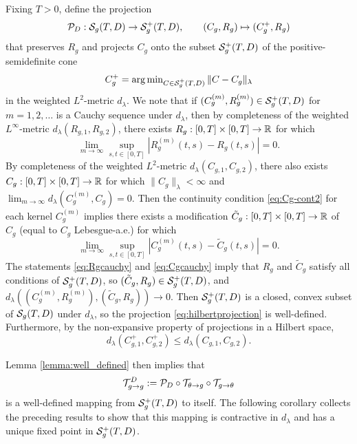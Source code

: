 Fixing $T>0$, define the projection
\[\mathcal{P}_D:\mathcal{S}_g(T,D) \to \mathcal{S}_g^+(T,D),
\qquad (C_g,R_g) \mapsto (C_g^+,R_g)\]
that preserves $R_g$ and projects $C_g$ onto the subset $\mathcal{S}_g^+(T,D)$ of the positive-semidefinite cone
\begin{equation}\label{eq:hilbertprojection}
C_g^+=\operatorname{arg\,min}_{C \in \mathcal{S}_g^+(T,D)} \|C-C_g\|_\lambda
\end{equation}
in the weighted $L^2$-metric $d_\lambda$. We note that if $(C_g^{(m)},R_g^{(m)}) \in \mathcal{S}_g^+(T,D)$
for $m=1,2,\ldots$ is a Cauchy sequence under $d_\lambda$,
then by completeness of the weighted $L^\infty$-metric
$d_\lambda(R_{g,1},R_{g,2})$, there exists $R_g:[0,T] \times [0,T] \to \mathbb{R}$ for
which
\begin{equation}\label{eq:Rgcauchy}
\lim_{m \to \infty} \sup_{s,t \in [0,T]} |R_g^{(m)}(t,s)-R_g(t,s)|=0.
\end{equation}
By completeness of the weighted $L^2$-metric $d_\lambda(C_{g,1},C_{g,2})$,
there also exists $C_g:[0,T] \times [0,T] \to \mathbb{R}$ for which
$\|C_g\|_\lambda<\infty$
and $\lim_{m \to \infty} d_\lambda(C_g^{(m)},C_g)=0$. 
Then the continuity condition \eqref{eq:Cg-cont2} for each kernel $C_g^{(m)}$
implies there exists
a modification $\tilde C_g:[0,T] \times [0,T] \to \mathbb{R}$ of $C_g$ (equal to $C_g$
Lebesgue-a.e.) for which
\begin{equation}\label{eq:Cgcauchy}
\lim_{m \to \infty} \sup_{s,t \in [0,T]} |C_g^{(m)}(t,s)-\tilde C_g(t,s)|=0.
\end{equation}
The statements \eqref{eq:Rgcauchy} and \eqref{eq:Cgcauchy} imply that $R_g$ and $\tilde C_g$ satisfy all conditions of
$\mathcal{S}_g^+(T,D)$, so $(\tilde C_g,R_g) \in \mathcal{S}_g^+(T,D)$,
and $d_\lambda((C_g^{(m)},R_g^{(m)}),(\tilde C_g,R_g)) \to 0$.
Then $\mathcal{S}_g^+(T,D)$ is a
closed, convex subset of $\mathcal{S}_g(T,D)$ under $d_\lambda$, so the
projection \eqref{eq:hilbertprojection} is well-defined. Furthermore, by the
non-expansive property of projections in a Hilbert space,
\begin{equation}\label{eq:projectioncontractive}
d_\lambda(C_{g,1}^+,C_{g,2}^+) \leq d_\lambda(C_{g,1},C_{g,2}).
\end{equation}

Lemma \ref{lemma:well_defined} then implies that
\[\mathcal{T}_{g \to g}^D:=\mathcal{P}_D \circ \mathcal{T}_{\theta \to g} \circ \mathcal{T}_{g \to \theta}\]
is a well-defined mapping from $\mathcal{S}_g^+(T,D)$ to itself. The following corollary
collects the preceding results to show that this mapping is contractive in
$d_\lambda$ and has a unique fixed point in $\mathcal{S}_g^+(T,D)$.
 
